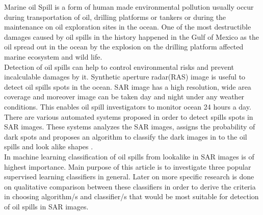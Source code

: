 Marine oil Spill is a form of human made environmental pollution usually occur during transportation of oil, drilling platforms or tankers \cite{Zhang201476}or during the maintenance on oil exploration sites in the ocean. One of the most destructible damages caused by oil spills in the history happened in the Gulf of Mexico as the oil spread out in the ocean by the explosion on the drilling platform affected marine ecosystem and wild life\cite{Bozeman2011244}.\\
Detection of oil spills can help to control environmental risks and prevent incalculable damages by it. Synthetic aperture radar(RAS) image is useful to detect oil spills spots in the ocean. SAR image has a high resolution, wide area coverage and moreover image can be taken day and night under any weather conditions. This enables oil spill investigators to monitor ocean 24 hours a day\cite{Chang20081915}.\\
There are various automated systems proposed in order to detect spills spots in SAR images. These systems analyzes the SAR images, assigns the probability of dark spots and proposes an algorithm to classify the dark images in to the oil spills and look alike shapes \cite{Xu201414,brekke2008classifiers,Keramitsoglou2006640,Guo2014146}.\\
In machine learning classification of oil spills from lookalike in SAR images is of highest importance. Main purpose of this article is to  investigate three popular supervised learning classifiers in general. Later on more specific research is done on qualitative comparison between these classifiers in order to derive the criteria in choosing algorithm/s and classifier/s that would be most suitable for detection of oil spills in SAR images. 
